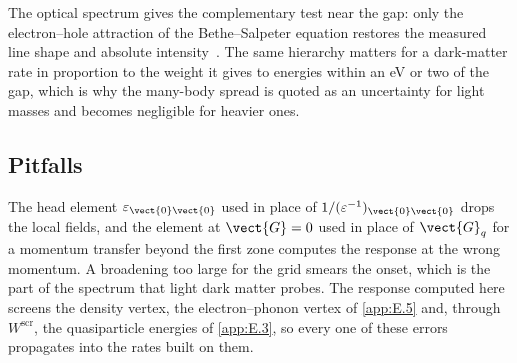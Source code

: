 The optical spectrum gives the complementary test near the gap: only the electron--hole attraction of the Bethe--Salpeter equation restores the measured line shape and absolute intensity~\cite{albrecht1998ab}. The same hierarchy matters for a dark-matter rate in proportion to the weight it gives to energies within an eV or two of the gap, which is why the many-body spread is quoted as an uncertainty for light masses and becomes negligible for heavier ones.

\subsection{Pitfalls}

The head element $\varepsilon_{\vect{0}\vect{0}}$ used in place of $1/(\varepsilon^{-1})_{\vect{0}\vect{0}}$ drops the local fields, and the element at $\vect{G} = 0$ used in place of $\vect{G}_q$ for a momentum transfer beyond the first zone computes the response at the wrong momentum. A broadening too large for the grid smears the onset, which is the part of the spectrum that light dark matter probes. The response computed here screens the density vertex, the electron--phonon vertex of \cref{app:E.5} and, through $W^{\mathrm{scr}}$, the quasiparticle energies of \cref{app:E.3}, so every one of these errors propagates into the rates built on them.
